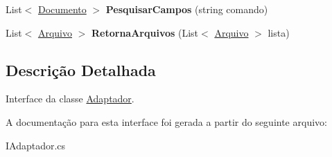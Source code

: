 \begin{DoxyCompactItemize}
\item 
\hypertarget{interface_sistema_r_h_1_1_i_adaptador_ac028b90b9103689275755eb8473638ff}{
List$<$ \hyperlink{class_sistema_r_h_1_1_documento}{Documento} $>$ {\bfseries PesquisarCampos} (string comando)}
\label{interface_sistema_r_h_1_1_i_adaptador_ac028b90b9103689275755eb8473638ff}

\item 
\hypertarget{interface_sistema_r_h_1_1_i_adaptador_a545fed60793e83c241af722d783d6438}{
List$<$ \hyperlink{class_sistema_r_h_1_1_arquivo}{Arquivo} $>$ {\bfseries RetornaArquivos} (List$<$ \hyperlink{class_sistema_r_h_1_1_arquivo}{Arquivo} $>$ lista)}
\label{interface_sistema_r_h_1_1_i_adaptador_a545fed60793e83c241af722d783d6438}

\end{DoxyCompactItemize}


\subsection{Descrição Detalhada}
Interface da classe \hyperlink{class_sistema_r_h_1_1_adaptador}{Adaptador}. 

A documentação para esta interface foi gerada a partir do seguinte arquivo:\begin{DoxyCompactItemize}
\item 
IAdaptador.cs\end{DoxyCompactItemize}
